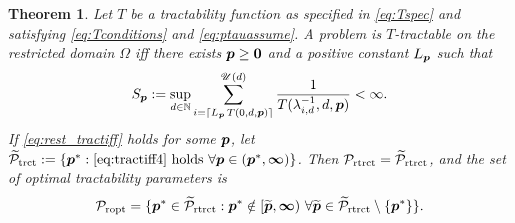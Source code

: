 \documentclass[sort&compress]{elsarticle}
\newcommand{\theUB}{\mathscr{U}}
\newtheorem{theorem}{Theorem}
\begin{document}
\begin{theorem}\label{thm_main_rest_tract}
Let $T$ be a tractability function as specified in \eqref{eq:Tspec} and satisfying \eqref{eq:Tconditions} and \eqref{eq:ptauassume}.  A problem is $T$-tractable on the restricted domain $\Omega$ iff there exists $\boldsymbol{p}\ge \boldsymbol{0}$ and a positive constant $L_{\boldsymbol{p}}$ such that
\begin{equation} \label{eq:rest_tractiff}
     S_{\vp}:=\sup_{d \in \naturals}
     \sum_{i = \lceil L_{\vp}\, T(0,d,\vp) \rceil}^{\theUB(d)} \frac{1}{T(\lambda^{-1}_{i,d},d,\vp)}< \infty.
\end{equation}
If \eqref{eq:rest_tractiff} holds for some $\boldsymbol{p}$, let $\widetilde{\mathcal{P}}_{\textup{trct}} : = \{\boldsymbol{p}^* : \eqref{eq:tractiff4} \text{ holds }\forall \boldsymbol{p} \in (\boldsymbol{p}^*,\boldsymbol{\infty}) \}$.
Then $\mathcal{P}_{\textup{rtrct}} = \widetilde{\mathcal{P}}_{\textup{rtrct}}$, and the set of optimal  tractability parameters is
\[
\mathcal{P}_{\textup{ropt}} =
\{\boldsymbol{p}^* \in \widetilde{\mathcal{P}}_{\textup{rtrct}} :  \boldsymbol{p}^* \notin [\widetilde{\boldsymbol{p}},\boldsymbol{\infty}) \ \forall \widetilde{\boldsymbol{p}}\in  \widetilde{\mathcal{P}}_{\textup{rtrct}} \setminus \{\boldsymbol{p}^*\} \}.
\]
\end{theorem}
\end{document}
